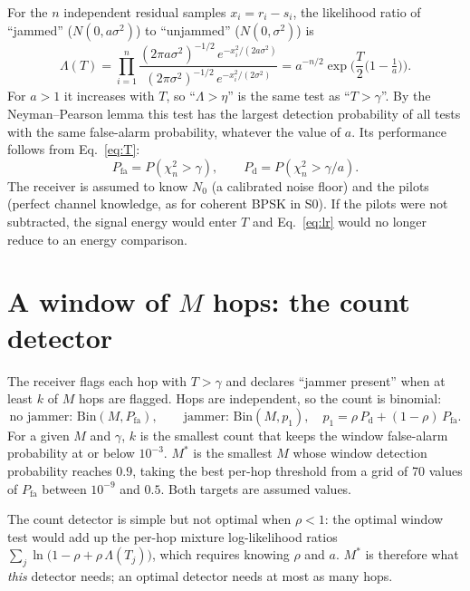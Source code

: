 \documentclass[11pt,a4paper]{article}
\newcommand{\Pfa}{P_{\mathrm{fa}}}
\newcommand{\Pd}{P_{\mathrm{d}}}
\begin{document}
For the $n$ independent residual samples $x_i = r_i - s_i$, the likelihood ratio of ``jammed'' ($N(0,a\sigma^2)$)
to ``unjammed'' ($N(0,\sigma^2)$) is
\begin{equation}
\Lambda(T) = \prod_{i=1}^{n}
\frac{(2\pi a\sigma^2)^{-1/2}\,e^{-x_i^2/(2a\sigma^2)}}{(2\pi\sigma^2)^{-1/2}\,e^{-x_i^2/(2\sigma^2)}}
= a^{-n/2}\exp\!\Big(\frac{T}{2}\big(1-\tfrac{1}{a}\big)\Big).
\label{eq:lr}
\end{equation}
For $a>1$ it increases with $T$, so ``$\Lambda > \eta$'' is the same test as
``$T>\gamma$''. By the Neyman--Pearson lemma this test has the largest detection
probability of all tests with the same false-alarm probability, whatever the
value of $a$. Its performance follows from Eq.~\eqref{eq:T}:
\begin{equation}
\Pfa = P(\chi^2_n > \gamma),\qquad \Pd = P(\chi^2_n > \gamma/a).
\label{eq:roc}
\end{equation}
The receiver is assumed to know $N_0$ (a calibrated noise floor) and the pilots
(perfect channel knowledge, as for coherent BPSK in S0). If the pilots were not
subtracted, the signal energy would enter $T$ and Eq.~\eqref{eq:lr} would no longer
reduce to an energy comparison.

\section{A window of $M$ hops: the count detector}

The receiver flags each hop with $T>\gamma$ and declares ``jammer present'' when
at least $k$ of $M$ hops are flagged. Hops are independent, so the count is
binomial:
\begin{equation}
\text{no jammer: } \mathrm{Bin}(M,\Pfa),\qquad
\text{jammer: } \mathrm{Bin}(M,p_1),\quad p_1 = \rho\,\Pd + (1-\rho)\,\Pfa .
\label{eq:bin}
\end{equation}
For a given $M$ and $\gamma$, $k$ is the smallest count that keeps the window
false-alarm probability at or below $10^{-3}$. $M^\ast$ is the smallest $M$ whose
window detection probability reaches $0.9$, taking the best per-hop threshold
from a grid of 70 values of $\Pfa$ between $10^{-9}$ and $0.5$. Both targets are
assumed values.

The count detector is simple but not optimal when $\rho<1$: the optimal window
test would add up the per-hop mixture log-likelihood ratios
$\sum_j \ln\big(1-\rho+\rho\,\Lambda(T_j)\big)$, which requires knowing $\rho$ and
$a$. $M^\ast$ is therefore what \emph{this} detector needs; an optimal detector
needs at most as many hops.
\end{document}

